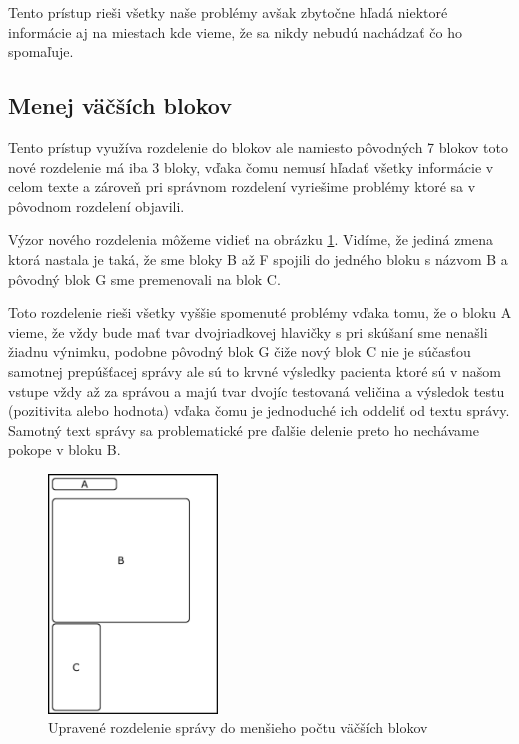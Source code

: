 Tento prístup rieši všetky naše problémy avšak zbytočne hľadá niektoré informácie aj na miestach kde vieme, že sa nikdy nebudú nachádzať čo ho spomaľuje.

\subsection{Menej väčších blokov}

Tento prístup využíva rozdelenie do blokov ale namiesto pôvodných 7 blokov toto nové rozdelenie má iba 3 bloky, vďaka čomu nemusí hľadať všetky informácie v celom texte a zároveň pri správnom rozdelení vyriešime problémy ktoré sa v pôvodnom rozdelení objavili. 

Výzor nového rozdelenia môžeme vidieť na obrázku \ref{obr:sprava_uprava}. Vidíme, že jediná zmena ktorá nastala je taká, že sme bloky B až F spojili do jedného bloku s názvom B a pôvodný blok G sme premenovali na blok C. 

Toto rozdelenie rieši všetky vyššie spomenuté problémy vďaka tomu, že o bloku A vieme, že vždy bude mať tvar dvojriadkovej hlavičky s pri skúšaní sme nenašli žiadnu výnimku, podobne pôvodný blok G čiže nový blok C nie je súčasťou samotnej prepúšťacej správy ale sú to krvné výsledky pacienta ktoré sú v našom vstupe vždy až za správou a majú tvar dvojíc testovaná veličina a výsledok testu (pozitivita alebo hodnota) vďaka čomu je jednoduché ich oddeliť od textu správy. Samotný text správy sa problematické pre ďalšie delenie preto ho nechávame pokope v bloku B.

\begin{figure}
	\centerline{\includegraphics[width=0.4\textwidth]{images/vyzor_spravy_vylepsena}}
	\caption[Upravené rozloženie správy]{Upravené rozdelenie správy do menšieho počtu väčších blokov}
	\label{obr:sprava_uprava}
\end{figure}
   